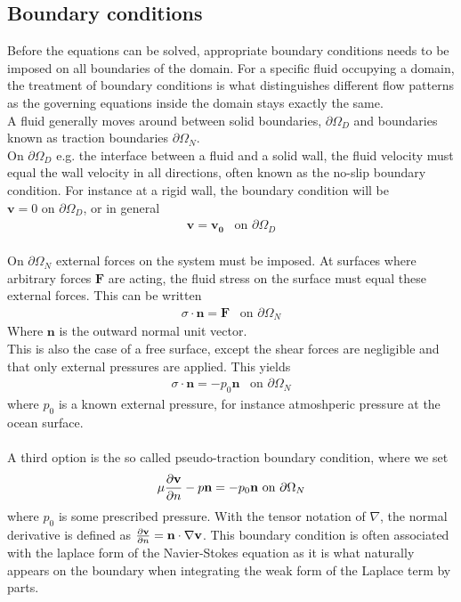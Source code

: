 \subsection{Boundary conditions}
Before the equations can be solved, appropriate boundary conditions needs to be imposed on all boundaries of the domain. For a specific fluid occupying a domain, the treatment of boundary conditions is what distinguishes different flow patterns as the governing equations inside the domain stays exactly the same. 
\\
A fluid generally moves around between solid boundaries, $\partial \Omega_D$ and boundaries known as traction boundaries $\partial \Omega_N$.
\\
On $\partial \Omega_D$ e.g. the interface between a fluid and a solid wall, the fluid velocity must equal the wall velocity in all directions, often known as the no-slip boundary condition. For instance at a rigid wall, the boundary condition will be $\mathbf{v} = 0 \text{ on } \partial \Omega_D$, or in general 
\begin{align}
\mathbf{v} = \mathbf{v_0} \,\,\, \text{ on } \partial \Omega_D
\end{align}
\\
On $\partial \Omega_N$ external forces on the system must be imposed. At surfaces where arbitrary forces $\mathbf{F}$ are acting, the fluid stress on the surface must equal these external forces. This can be written
\begin{align}
\sigma \cdot \mathbf{n} = \mathbf{F}\,\,\, \text{ on } \partial \Omega_N
\end{align}
Where $\mathbf{n}$ is the outward normal unit vector. 
\\
This is also the case of a free surface, except the shear forces are negligible and that only external pressures are applied. This yields
\begin{align}
\sigma \cdot \mathbf{n} = -p_0 \mathbf{n} \,\,\, \text{ on } \partial \Omega_N
\end{align}
where $p_0$ is a known external pressure, for instance atmoshperic pressure at the ocean surface. 
\\
\\
A third option is the so called pseudo-traction boundary condition, where we set
\begin{align}
\mu \frac{\partial \mathbf{v}}{\partial n} - p\mathbf{n} = -p_0\mathbf{n} \text{ on } \partial \Omega_N\label{PT}
\end{align}
where $p_0$ is some prescribed pressure. With the tensor notation of $\nabla$, the normal derivative is defined as $\frac{\partial \mathbf{v}}{\partial n} = \mathbf{n} \cdot \nabla \mathbf{v}$. This boundary condition is often associated with the laplace form of the Navier-Stokes equation as it is what naturally appears on the boundary when integrating the weak form of the Laplace term by parts.
